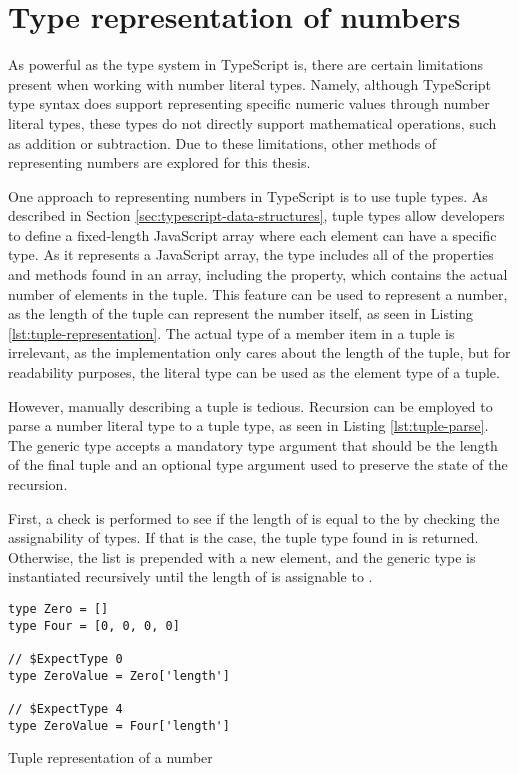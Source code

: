 \section{Type representation of numbers}

As powerful as the type system in TypeScript is, there are certain limitations present when working with number literal types. Namely, although TypeScript type syntax does support representing specific numeric values through number literal types, these types do not directly support mathematical operations, such as addition or subtraction. Due to these limitations, other methods of representing numbers are explored for this thesis.

One approach to representing numbers in TypeScript is to use tuple types. As described in Section \ref{sec:typescript-data-structures}, tuple types allow developers to define a fixed-length JavaScript array where each element can have a specific type. As it represents a JavaScript array, the type includes all of the properties and methods found in an array, including the  property, which contains the actual number of elements in the tuple. This feature can be used to represent a number, as the length of the tuple can represent the number itself, as seen in Listing \ref{lst:tuple-representation}. The actual type of a member item in a tuple is irrelevant, as the implementation only cares about the length of the tuple, but for readability purposes, the literal type  can be used as the element type of a tuple.

However, manually describing a tuple is tedious. Recursion can be employed to parse a number literal type to a tuple type, as seen in Listing \ref{lst:tuple-parse}. The  generic type accepts a mandatory type argument  that should be the length of the final tuple and an optional type argument  used to preserve the state of the recursion.

First, a check is performed to see if the length of  is equal to the  by checking the assignability of types. If that is the case, the tuple type found in  is returned. Otherwise, the list is prepended with a new  element, and the generic type is instantiated recursively until the length of  is assignable to .

\clearpage

\begin{listing}[ht]
  \begin{verbatim}
type Zero = []
type Four = [0, 0, 0, 0] 

// $ExpectType 0
type ZeroValue = Zero['length']

// $ExpectType 4
type ZeroValue = Four['length']
\end{verbatim}
  \caption{Tuple representation of a number}\label{lst:tuple-representation}
\end{listing}


